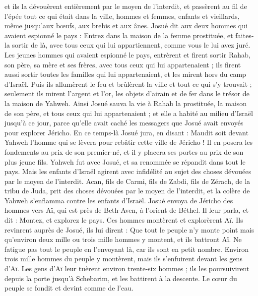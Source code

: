 \begin{multicols}{2}
et ils la dévouèrent entièrement par le moyen de l'interdit, et passèrent au fil de l’épée tout ce qui était dans la ville, hommes et femmes, enfants et vieillards, même jusqu’aux bœufs, aux brebis et aux ânes.
Josué dit aux deux hommes qui avaient espionné le pays : Entrez dans la maison de la femme prostituée, et faites-la sortir de là, avec tous ceux qui lui appartiennent, comme vous le lui avez juré.
Les jeunes hommes qui avaient espionné le pays, entrèrent et firent sortir Rahab, son père, sa mère et ses frères, avec tous ceux qui lui appartenaient ; ils firent aussi sortir toutes les familles qui lui appartenaient, et les mirent hors du camp d’Israël.
Puis ils allumèrent le feu et brûlèrent la ville et tout ce qui s’y trouvait ; seulement ils mirent l’argent et l’or, les objets d’airain et de fer dans le trésor de la maison de Yahweh.
Ainsi Josué sauva la vie à Rahab la prostituée, la maison de son père, et tous ceux qui lui appartenaient ; et elle a habité au milieu d’Israël jusqu’à ce jour, parce qu’elle avait caché les messagers que Josué avait envoyés pour explorer Jéricho.
En ce temps-là Josué jura, en disant : Maudit soit devant Yahweh l’homme qui se lèvera pour rebâtir cette ville de Jéricho ! Il en posera les fondements au prix de son premier-né, et il y placera ses portes au prix de son plus jeune fils.
Yahweh fut avec Josué, et sa renommée se répandit dans tout le pays.
\VerseOne{}Mais les enfants d’Israël agirent avec infidélité au sujet des choses dévouées par le moyen de l'interdit. Acan, fils de Carmi, fils de Zabdi, fils de Zérach, de la tribu de Juda, prit des choses dévouées par le moyen de l'interdit, et la colère de Yahweh s’enflamma contre les enfants d’Israël.
Josué envoya de Jéricho des hommes vers Aï, qui est près de Beth-Aven, à l’orient de Béthel. Il leur parla, et dit : Montez, et explorez le pays. Ces hommes montèrent et explorèrent Aï.
Ils revinrent auprès de Josué, ils lui dirent : Que tout le peuple n’y monte point mais qu’environ deux mille ou trois mille hommes y montent, et ils battront Aï. Ne fatigue pas tout le peuple en l’envoyant là, car ils sont en petit nombre.
Environ trois mille hommes du peuple y montèrent, mais ils s’enfuirent devant les gens d’Aï.
Les gens d’Aï leur tuèrent environ trente-six hommes ; ils les poursuivirent depuis la porte jusqu’à Schebarim, et les battirent à la descente. Le cœur du peuple se fondit et devint comme de l’eau.

\end{multicols}
